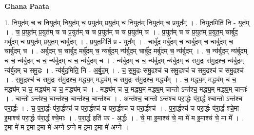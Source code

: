\documentclass[17pt]{extarticle}
\begin{document}
\textbf{Ghana Paata } \newline

1. नि॒युत॑म् च च नि॒युत॑म् नि॒युत॑म् च प्र॒युत॑म् प्र॒युत॑म् च नि॒युत॑म् नि॒युत॑म् च प्र॒युत᳚म् । . नि॒युत॒मिति॑ नि - युत᳚म् । . च॒ प्र॒युत॑म् प्र॒युत॑म् च च प्र॒युत॑म् च च प्र॒युत॑म् च च प्र॒युत॑म् च । . प्र॒युत॑म् च च प्र॒युत॑म् प्र॒युत॒म् चार्बु॑द॒ मर्बु॑दम् च प्र॒युत॑म् प्र॒युत॒म् चार्बु॑दम् । . प्र॒युत॒मिति॑ प्र - युत᳚म् । . चार्बु॑द॒ मर्बु॑दम् च॒ चार्बु॑दम् च॒ चार्बु॑दम् च॒ चार्बु॑दम् च । . अर्बु॑दम् च॒ चार्बु॑द॒ मर्बु॑दम् च॒ न्य॑र्बुद॒म् न्य॑र्बुद॒म् चार्बु॑द॒ मर्बु॑दम् च॒ न्य॑र्बुदम् । . च॒ न्य॑र्बुद॒म् न्य॑र्बुदम् च च॒ न्य॑र्बुदम् च च॒ न्य॑र्बुदम् च च॒ न्य॑र्बुदम् च । . न्य॑र्बुदम् च च॒ न्य॑र्बुद॒म् न्य॑र्बुदम् च समु॒द्रः स॑मु॒द्रश्च॒ न्य॑र्बुद॒म् न्य॑र्बुदम् च समु॒द्रः । . न्य॑र्बुद॒मिति॒ नि - अ॒र्बु॒द॒म् । . च॒ स॒मु॒द्रः स॑मु॒द्रश्च॑ च समु॒द्रश्च॑ च समु॒द्रश्च॑ च समु॒द्रश्च॑ । . स॒मु॒द्रश्च॑ च समु॒द्रः स॑मु॒द्रश्च॒ मद्ध्य॒म् मद्ध्य॑म् च समु॒द्रः स॑मु॒द्रश्च॒ मद्ध्य᳚म् । . च॒ मद्ध्य॒म् मद्ध्य॑म् च च॒ मद्ध्य॑म् च च॒ मद्ध्य॑म् च च॒ मद्ध्य॑म् च । . मद्ध्य॑म् च च॒ मद्ध्य॒म् मद्ध्य॒म् चान्तो ऽन्त॑श्च॒ मद्ध्य॒म् मद्ध्य॒म् चान्तः॑ । . चान्तो ऽन्त॑श्च॒ चान्त॑श्च॒ चान्त॑श्च॒ चान्त॑श्च । . अन्त॑श्च॒ चान्तो ऽन्त॑श्च परा॒र्द्धः प॑रा॒र्द्ध श्चान्तो ऽन्त॑श्च परा॒र्द्धः । . च॒ प॒रा॒र्द्धः प॑रा॒र्द्धश्च॑ च परा॒र्द्धश्च॑ च परा॒र्द्धश्च॑ च परा॒र्द्धश्च॑ । . प॒रा॒र्द्धश्च॑ च परा॒र्द्धः प॑रा॒र्द्ध श्चे॒मा इ॒माश्च॑ परा॒र्द्धः प॑रा॒र्द्ध श्चे॒माः । . प॒रा॒र्द्ध इति॑ पर - अ॒र्द्धः । . चे॒ मा इ॒माश्च॑ चे॒ मा मे॑ म इ॒माश्च॑ चे॒ मा मे᳚ । . इ॒मा मे॑ म इ॒मा इ॒मा मे॑ अग्ने ऽग्ने म इ॒मा इ॒मा मे॑ अग्ने । \newline
\end{document}

